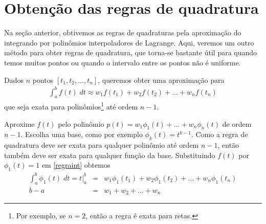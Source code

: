 \section{Obtenção das regras de quadratura}

Na seção anterior, obtivemos as regras de quadraturas pela aproximação do integrando por polinômios interpoladores de Lagrange. Aqui, veremos um outro método para obter regras de quadratura, que torna-se bastante útil para quando temos muitos pontos ou quando o intervalo entre os pontos não é uniforme.

Dados $n$ pontos $[t_1,t_2,\ldots ,t_n]$, queremos obter uma aproximação para
\begin{align}\label{regraint}
  \int _a^b f(t) \;dt \approx w_1f(t_1)+w_2f(t_2)+\ldots +w_nf(t_n)
\end{align}
que seja exata para polinômios\footnote{Por exemplo, se $n=2$, então a regra é exata para retas.} até ordem  $n-1$.

Aproxime $f(t)$ pelo polinômio $p(t)=w_1\phi_1(t)+\ldots +w_n \phi_n(t)$ de ordem $n-1$. Escolha uma base, como por exemplo $\phi _k(t)=t^{k-1}$. Como a regra de quadratura deve ser exata para qualquer polinômio até ordem $n-1$, então também deve ser exata para qualquer função da base. Substituindo $f(t)$ por $\phi _1(t)=1$ em \eqref{regraint} obtemos 
\begin{eqnarray}
\int _a^b \phi_1(t) \; dt = t|_a^b &=&  w_1\phi _1(t_1)+w_2\phi _1(t_2)+\ldots +w_n\phi_1(t_n) \\
                              b-a  &=&  w_1+w_2+\ldots +w_n
\end{eqnarray}

